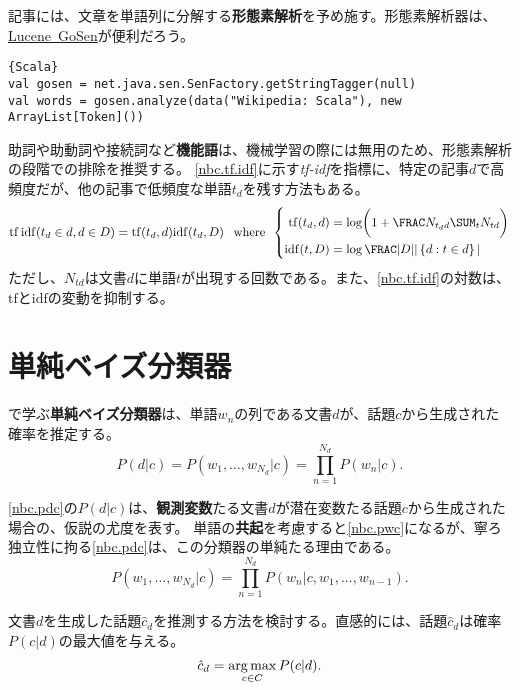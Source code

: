 \documentclass[10pt,a4paper]{book}
\begin{document}
記事には、文章を単語列に分解する\textbf{形態素解析}を予め施す。形態素解析器は、\href{http://github.com/lucene-gosen/lucene-gosen}{Lucene~GoSen}が便利だろう。

\begin{Verbatim}{Scala}
val gosen = net.java.sen.SenFactory.getStringTagger(null)
val words = gosen.analyze(data("Wikipedia: Scala"), new ArrayList[Token]())
\end{Verbatim}

助詞や助動詞や接続詞など\textbf{機能語}は、機械学習の際には無用のため、形態素解析の段階での排除を推奨する。
\eqref{nbc.tf.idf}に示す\textit{tf-idf}を指標に、特定の記事$d$で高頻度だが、他の記事で低頻度な単語$t_d$を残す方法もある。
%
\begin{equation}
\label{eq:nbc.tf.idf}
\mathrm{tf\,idf}(t_d \in d,d \in D) = \mathrm{tf}(t_d,d) \mathrm{idf}(t_d,D)\;
\where\left\{
\begin{aligned}
\mathrm{tf}(t_d,d) &= \log \biggl(1+\frac{N_{t_dd}}{\sum_t N_{td}}\biggr) \\
\mathrm{idf}(t,D) &= \log \frac{|D|}{|\seq{d: t \in d}|}
\end{aligned}
\right.
\end{equation}
%
ただし、$N_{td}$は文書$d$に単語$t$が出現する回数である。また、\eqref{nbc.tf.idf}の対数は、$\mathrm{tf}$と$\mathrm{idf}$の変動を抑制する。

\section{単純ベイズ分類器\label{sect:topic.nbc}}

で学ぶ\textbf{単純ベイズ分類器}は、単語$w_n$の列である文書$d$が、話題$c$から生成された確率を推定する。
%
\begin{equation}
\label{eq:nbc.pdc}
P(d|c) = P(w_1,\dots,w_{N_d}|c) = \prod_{n=1}^{N_d} P(w_n|c).
\end{equation}

\eqref{nbc.pdc}の$P(d|c)$は、\textbf{観測変数}たる文書$d$が潜在変数たる話題$c$から生成された場合の、仮説の尤度を表す。
単語の\textbf{共起}を考慮すると\eqref{nbc.pwc}になるが、寧ろ独立性に拘る\eqref{nbc.pdc}は、この分類器の単純たる理由である。
%
\begin{equation}
\label{eq:nbc.pwc}
P(w_1,\dots,w_{N_d}|c) = \prod_{n=1}^{N_d} P(w_n|c,w_1,...,w_{n-1}).
\end{equation}

文書$d$を生成した話題$\hat{c}_d$を推測する方法を検討する。直感的には、話題$\hat{c}_d$は確率$P(c|d)$の最大値を与える。
%
\begin{equation}
\label{eq:nbc.pcd}
\hat{c}_d = \operatorname*{arg\,max}_{c \in C} P(c|d).
\end{equation}
\end{document}
